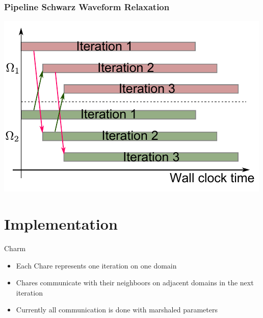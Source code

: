 \documentclass[]{beamer}
\begin{document}
\begin{frame}
  \frametitle{Pipeline Schwarz Waveform Relaxation}
  \centering
  \includegraphics[height=0.7\textheight]{figures/pswr}
\end{frame}


\section{Implementation}

\begin{frame}{Charm}

  \begin{itemize}
  \item Each Chare represents one iteration on one domain
  \item Chares communicate with their neighboors on adjacent domains
    in the next iteration
  \item Currently all communication is done with marshaled parameters
  \end{itemize}

\end{frame}

\begin{frame}
  
      \begin{figure}
        \centering
      \end{figure}

\end{frame}
\end{document}
